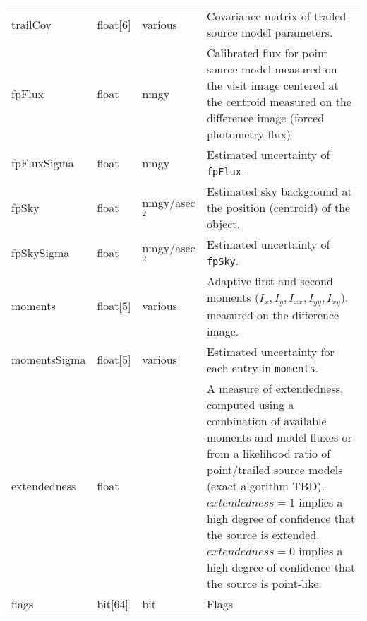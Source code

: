\documentclass[12pt]{article}
\begin{document}
\begin{center}
\begin{longtable}{p{3cm}p{2cm}p{2cm}p{5cm}}
trailCov & float[6] & various & Covariance matrix of trailed source model
parameters. \\ 

fpFlux & float & nmgy & Calibrated flux for point source model measured on the
visit image centered at the centroid measured on the difference image (forced
photometry flux) \\ 

fpFluxSigma & float & nmgy & Estimated uncertainty of \texttt{fpFlux}. \\ 

fpSky & float & nmgy/asec$^{2}$ & Estimated sky background at the position
(centroid) of the object. \\ 

fpSkySigma & float & nmgy/asec$^{2}$ & Estimated uncertainty of
\texttt{fpSky}. \\ 



moments & float[5] & various & Adaptive first and second moments ($I_{x},
I_{y}, I_{xx}, I_{yy}, I_{xy}$), measured on the difference image. \\ 

momentsSigma & float[5] & various & Estimated uncertainty for each entry in
\texttt{moments}. \\ 

extendedness & float & ~ & A measure of extendedness, computed using a
combination of available moments and model fluxes or from a likelihood ratio
of point/trailed source models (exact algorithm TBD). $extendedness=1$ implies
a high degree of confidence that the source is extended. $extendedness=0$
implies a high degree of confidence that the source is point-like. \\

flags & bit[64] & bit & Flags \\ \hline
\end{longtable}
\end{center}
\end{document}
